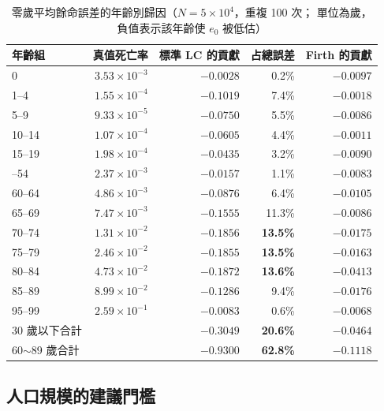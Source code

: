 \documentclass[UTF8, fontset=macnew, a4paper, 12pt]{ctexart}
\begin{document}
\begin{table}[H]
\centering
\caption{零歲平均餘命誤差的年齡別歸因（$N=5\times10^4$，重複 100 次；
單位為歲，負值表示該年齡使 $e_0$ 被低估）}
\small
\begin{tabular}{lrrrr}
\toprule
年齡組 & 真值死亡率 & 標準 LC 的貢獻 & 占總誤差 & Firth 的貢獻\\
\midrule
0       & $3.53\times10^{-3}$ & $-0.0028$ & 0.2\% & $-0.0097$\\
1--4    & $1.55\times10^{-4}$ & $-0.1019$ & 7.4\% & $-0.0018$\\
5--9    & $9.33\times10^{-5}$ & $-0.0750$ & 5.5\% & $-0.0086$\\
10--14  & $1.07\times10^{-4}$ & $-0.0605$ & 4.4\% & $-0.0011$\\
15--19  & $1.98\times10^{-4}$ & $-0.0435$ & 3.2\% & $-0.0090$\\
\addlinespace
50--54  & $2.37\times10^{-3}$ & $-0.0157$ & 1.1\% & $-0.0083$\\
60--64  & $4.86\times10^{-3}$ & $-0.0876$ & 6.4\% & $-0.0105$\\
65--69  & $7.47\times10^{-3}$ & $-0.1555$ & 11.3\% & $-0.0086$\\
70--74  & $1.31\times10^{-2}$ & \textbf{$-0.1856$} & \textbf{13.5\%} & $-0.0175$\\
75--79  & $2.46\times10^{-2}$ & \textbf{$-0.1855$} & \textbf{13.5\%} & $-0.0163$\\
80--84  & $4.73\times10^{-2}$ & \textbf{$-0.1872$} & \textbf{13.6\%} & $-0.0413$\\
85--89  & $8.99\times10^{-2}$ & $-0.1286$ & 9.4\% & $-0.0176$\\
95--99  & $2.59\times10^{-1}$ & $-0.0083$ & 0.6\% & $-0.0068$\\
\midrule
30 歲以下合計 & & $-0.3049$ & \textbf{20.6\%} & $-0.0464$\\
60$\sim$89 歲合計 & & $-0.9300$ & \textbf{62.8\%} & $-0.1118$\\
\bottomrule
\end{tabular}
\label{tab:e0attr}
\end{table}
\subsection{人口規模的建議門檻}
\end{document}

